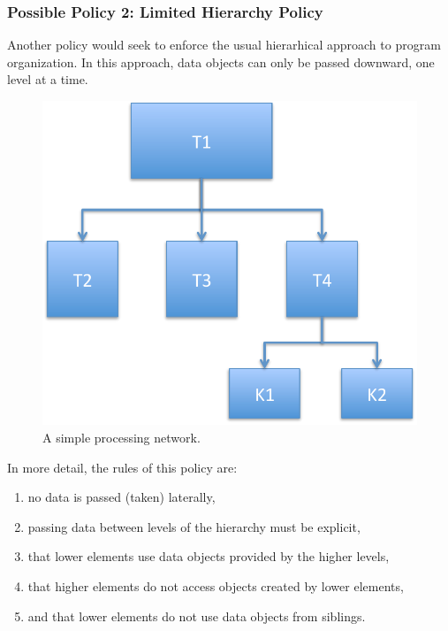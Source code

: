 \subsubsection{Possible Policy 2: Limited Hierarchy Policy}

Another policy would seek to enforce the usual hierarhical approach to program organization.
In this approach, data objects can only be passed downward, one level at a time.

\begin{figure}[ht]
\centering
\includegraphics[scale=0.5]{figures/SimpleHierarchy.pdf}
\parbox{6in}{\caption{A simple processing network.\label{simple_hierarchy_fig}}}
\end{figure}

In more detail, the rules of this policy are:
\begin{enumerate}
\item no data is passed (taken) laterally,
\item passing data between levels of the hierarchy must be explicit,
\item that lower elements use data objects provided by the higher levels,
\item that higher elements do not access objects created by lower elements,
\item and that lower elements do not use data objects from siblings.
\end{enumerate}

